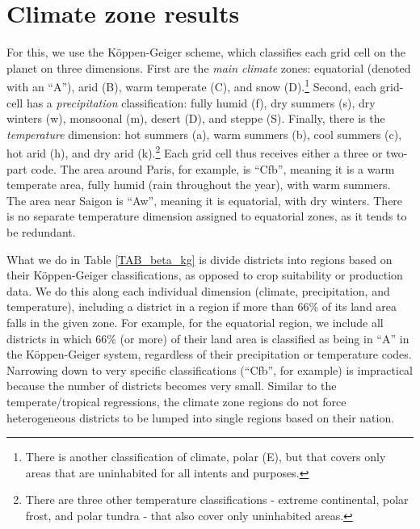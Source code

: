 \documentclass[11pt]{article}
\begin{document}
\section{Climate zone results}
For this, we use the K{\"o}ppen-Geiger scheme, which classifies each grid cell on the planet on three dimensions. First are the \textit{main climate} zones: equatorial (denoted with an ``A''), arid (B), warm temperate (C), and snow (D).\footnote{There is another classification of climate, polar (E), but that covers only areas that are uninhabited for all intents and purposes.} Second, each grid-cell has a \textit{precipitation} classification: fully humid (f), dry summers (s), dry winters (w), monsoonal (m), desert (D), and steppe (S). Finally, there is the \textit{temperature} dimension: hot summers (a), warm summers (b), cool summers (c), hot arid (h), and dry arid (k).\footnote{There are three other temperature classifications - extreme continental, polar frost, and polar tundra - that also cover only uninhabited areas.} Each grid cell thus receives either a three or two-part code. The area around Paris, for example, is ``Cfb'', meaning it is a warm temperate area, fully humid (rain throughout the year), with warm summers. The area near Saigon is ``Aw'', meaning it is equatorial, with dry winters. There is no separate temperature dimension assigned to equatorial zones, as it tends to be redundant.

What we do in Table \ref{TAB_beta_kg} is divide districts into regions based on their K{\"o}ppen-Geiger classifications, as opposed to crop suitability or production data. We do this along each individual dimension (climate, precipitation, and temperature), including a district in a region if more than 66\% of its land area falls in the given zone. For example, for the equatorial region, we include all districts in which 66\% (or more) of their land area is classified as being in ``A'' in the K{\"o}ppen-Geiger system, regardless of their precipitation or temperature codes. Narrowing down to very specific classifications (``Cfb'', for example) is impractical because the number of districts becomes very small. Similar to the temperate/tropical regressions, the climate zone regions do not force heterogeneous districts to be lumped into single regions based on their nation. 
\end{document}
